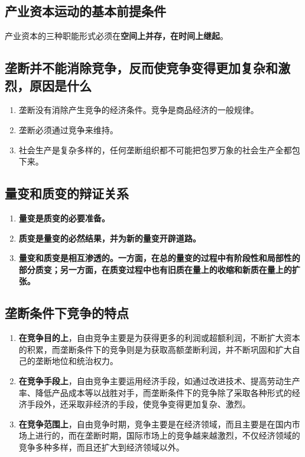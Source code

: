 \documentclass[12pt, a4paper, oneside]{ctexbook}
\begin{document}
\subsection{产业资本运动的基本前提条件}

产业资本的三种职能形式必须在\textbf{空间上并存，在时间上继起}。

\subsection{垄断并不能消除竞争，反而使竞争变得更加复杂和激烈，原因是什么}

\begin{enumerate}
\item 垄断没有消除产生竞争的经济条件。竞争是商品经济的一般规律。
\item 垄断必须通过竞争来维持。
\item 社会生产是复杂多样的，任何垄断组织都不可能把包罗万象的社会生产全都包下来。
\end{enumerate}

\subsection{量变和质变的辩证关系}

\begin{enumerate}
\item \textbf{量变是质变的必要准备。}
\item \textbf{质变是量变的必然结果，并为新的量变开辟道路。}
\item \textbf{量变和质变是相互渗透的。一方面，在总的量变的过程中有阶段性和局部性的部分质变；另一方面，在质变过程中也有旧质在量上的收缩和新质在量上的扩张。}
\end{enumerate}

\subsection{垄断条件下竞争的特点}

\begin{enumerate}
\item \textbf{在竞争目的上}，自由竞争主要是为获得更多的利润或超额利润，不断扩大资本的积累，而垄断条件下的竞争则是为获取高额垄断利润，并不断巩固和扩大自己的垄断地位和统治权力。
\item \textbf{在竞争手段上}，自由竞争主要运用经济手段，如通过改进技术、提高劳动生产率、降低产品成本等以战胜对手，而垄断条件下的竞争除了采取各种形式的经济手段外，还采取非经济的手段，使竞争变得更加复杂、激烈。
\item \textbf{在竞争范围上}，自由竞争时期，竞争主要是在经济领域，而且主要是在国内市场上进行的，而在垄断时期，国际市场上的竞争越来越激烈，不仅经济领域的竞争多种多样，而且还扩大到经济领域以外。
\end{enumerate}
\end{document}
